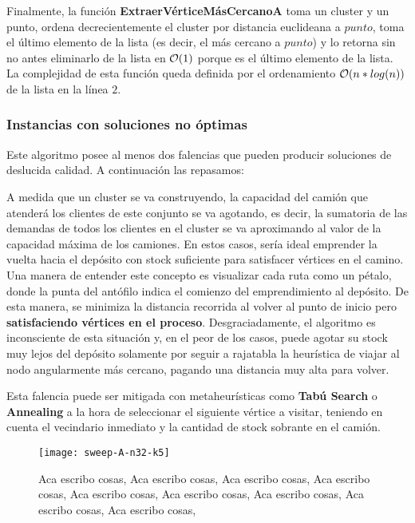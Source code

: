 
Finalmente, la función \textbf{ExtraerVérticeMásCercanoA} toma un cluster y un punto, ordena decrecientemente el cluster por distancia euclideana a $punto$, toma el último elemento de la lista (es decir, el más cercano a $punto$) y lo retorna sin no antes eliminarlo de la lista en $\mathcal{O}(1)$ porque es el último elemento de la lista. La complejidad de esta función queda definida por el ordenamiento $\mathcal{O}(n*log(n))$ de la lista en la línea $2$.

\subsubsection{Instancias con soluciones no óptimas}
Este algoritmo posee al menos dos falencias que pueden producir soluciones de deslucida calidad. A continuación las repasamos:

A medida que un cluster se va construyendo, la capacidad del camión que atenderá los clientes de este conjunto se va agotando, es decir, la sumatoria de las demandas de todos los clientes en el cluster se va aproximando al valor de la capacidad máxima de los camiones. En estos casos, sería ideal emprender la vuelta hacia el depósito con stock suficiente para satisfacer vértices en el camino. Una manera de entender este concepto es visualizar cada ruta como un pétalo, donde la punta del antófilo indica el comienzo del emprendimiento al depósito. De esta manera, se minimiza la distancia recorrida al volver al punto de inicio pero \textbf{satisfaciendo vértices en el proceso}. Desgraciadamente, el algoritmo es inconsciente de esta situación y, en el peor de los casos, puede agotar su stock muy lejos del depósito solamente por seguir a rajatabla la heurística de viajar al nodo angularmente más cercano, pagando una distancia muy alta para volver.

\vskip 8pt

Esta falencia puede ser mitigada con metaheurísticas como \textbf{Tabú Search} o \textbf{Annealing} a la hora de seleccionar el siguiente vértice a visitar, teniendo en cuenta el vecindario inmediato y la cantidad de stock sobrante en el camión.

\begin{figure}[H]
	\centering
	\begin{minipage}{0.48\textwidth}
		\centering
		\texttt{[image: sweep-A-n32-k5]}
		\label{fig:sweep-A-n32-k5}
	\end{minipage}%
	\hspace{0.03\textwidth}
	\begin{minipage}{0.48\textwidth}
		Aca escribo cosas, Aca escribo cosas, Aca escribo cosas, Aca escribo cosas, Aca escribo cosas, Aca escribo cosas, Aca escribo cosas, Aca escribo cosas, Aca escribo cosas,
	\end{minipage}%
\end{figure}

